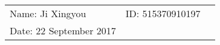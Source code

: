 \documentclass{article}
\begin{document}
\vspace*{0.25cm}

\hrulefill

\thispagestyle{empty}

\begin{center}
\begin{large}
\end{large}

\hrulefill

\vspace*{5cm}
\begin{Large}
\end{Large}

\vspace{2em}

\begin{large}
\end{large}
\end{center}


\vfill

\begin{table}[h!]
\flushleft
\begin{tabular}{lll}
Name: Ji Xingyou \hspace*{2em}&
ID: 515370910197\hspace*{2em}
\\

Date: 22 September 2017

\end{tabular}
\end{table}

\hfill
\newpage
\end{document}
